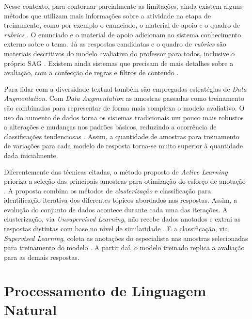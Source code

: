 Nesse contexto, para contornar parcialmente as limitações, ainda existem alguns métodos que utilizam mais informações sobre a atividade na etapa de treinamento, como por exemplo o enunciado, o material de apoio e o quadro de \textit{rubrics} \cite{ramachandran2015b, wang2019}. O enunciado e o material de apoio adicionam ao sistema conhecimento externo sobre o tema. Já as respostas candidatas e o quadro de \textit{rubrics} são materiais descritivos do modelo avaliativo do professor para todos, inclusive o próprio SAG \cite{mizumoto2019, marvaniya2018}. Existem ainda sistemas que precisam de mais detalhes sobre a avaliação, com a confecção de regras e filtros de conteúdo \cite{butcher2010, pribadi2017}.

Para lidar com a diversidade textual também são empregadas estratégias de \textit{Data Augmentation}. Com \textit{Data Augmentation} as amostras passadas como treinamento são combinadas para representar de forma mais complexa o modelo avaliativo. O uso do aumento de dados torna os sistemas tradicionais um pouco mais robustos a alterações e mudanças nos padrões básicos, reduzindo a ocorrência de classificações tendenciosas \cite{kumar2019, lun2020}. Assim, a quantidade de amostras para treinamento de variações para cada modelo de resposta torna-se muito superior à quantidade dada inicialmente.

Diferentemente das técnicas citadas, o método proposto de \textit{Active Learning} prioriza a seleção das principais amostras para otimização do esforço de anotação \cite{kumar2020}. A proposta combina os métodos de \textit{clusterização} \cite{spalenza2019} e classificação \cite{oliveira2014} para identificação iterativa dos diferentes tópicos abordados nas respostas. Assim, a evolução do conjunto de dados acontece durante cada uma das iterações. A clusterização, via \textit{Unsupervised Learning}, não recebe dados anotados e extrai as respostas distintas com base no nível de similaridade \cite{everitt2011}. E a classificação, via \textit{Supervised Learning}, coleta as anotações do especialista nas amostras selecionadas para treinamento do modelo \cite{bishop2006}. A partir daí, o modelo treinado replica a avaliação para as demais respostas.


\section{Processamento de Linguagem Natural}

